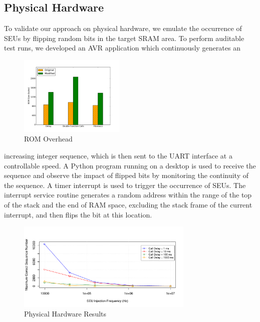 \subsection{Physical Hardware}
\vspace{-5pt}
To validate our approach on physical hardware, we emulate the occurrence of SEUs by flipping random bits in the target SRAM area. To perform auditable test runs, we developed an AVR application which continuously generates an 
\begin{figure}
	\vspace{-35pt}
	\begin{center}
		\includegraphics[width=0.45\textwidth]{figures/space_overhead.pdf}
	\end{center}
	\vspace{-15pt}
	\caption{ROM Overhead}
	\vspace{-25pt}
	\label{fig:space_overhead}
\end{figure}
increasing integer sequence, which is then sent to the UART interface at a controllable speed. A Python program running on a desktop is used to receive the sequence and observe the impact of flipped bits by monitoring the continuity of the sequence. A timer interrupt is used to trigger the occurrence of SEUs. The interrupt service routine generates a random address within the range of the top of the stack and the end of RAM space, excluding the stack frame of the current interrupt, and then flips the bit at this location. 
\vspace{-30pt}
\begin{figure}[h]
	\centering
	\includegraphics[width=0.75\textwidth]{figures/experiment1.pdf}
	\vspace{-5pt}
	\caption{Physical Hardware Results}
	\label{fig:exp1_result}
\end{figure}
\vspace{-20pt}


